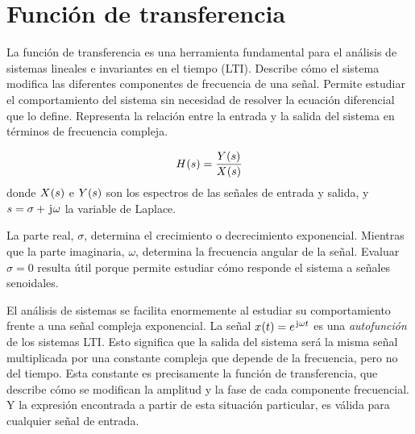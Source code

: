 \begin{mdframed}[style=DefinitionFrame]
    \begin{defn}
    \end{defn}
\end{mdframed}

\begin{mdframed}[style=DefinitionFrame]
    \begin{defn}
    \end{defn}
\end{mdframed}

\section{Función de transferencia}

La función de transferencia es una herramienta fundamental para el análisis de sistemas lineales e invariantes en el tiempo (LTI).
Describe cómo el sistema modifica las diferentes componentes de frecuencia de una señal.
Permite estudiar el comportamiento del sistema sin necesidad de resolver la ecuación diferencial que lo define.
Representa la relación entre la entrada y la salida del sistema en términos de frecuencia compleja.

\begin{mdframed}[style=DefinitionFrame]
    \begin{defn}
    \end{defn}
    \[
        \fx[H]{s} = \frac{\fx[Y]{s}}{\fx[X]{s}}
    \]
    donde $\fx[X]{s}$ e $\fx[Y]{s}$ son los espectros de las señales de entrada y salida, y $s = \sigma + \iu \omega$ la variable de Laplace.
\end{mdframed}

La parte real, $\sigma$, determina el crecimiento o decrecimiento exponencial.
Mientras que la parte imaginaria, $\omega$, determina la frecuencia angular de la señal.
Evaluar $\sigma = 0$ resulta útil porque permite estudiar cómo responde el sistema a señales senoidales.

El análisis de sistemas se facilita enormemente al estudiar su comportamiento frente a una señal compleja exponencial.
La señal $\fx[x]{t} = e^{\iu \omega t}$ es una \emph{autofunción} de los sistemas LTI.
Esto significa que la salida del sistema será la misma señal multiplicada por una constante compleja que depende de la frecuencia, pero no del tiempo.
Esta constante es precisamente la función de transferencia, que describe cómo se modifican la amplitud y la fase de cada componente frecuencial.
Y la expresión encontrada a partir de esta situación particular, es válida para cualquier señal de entrada.

